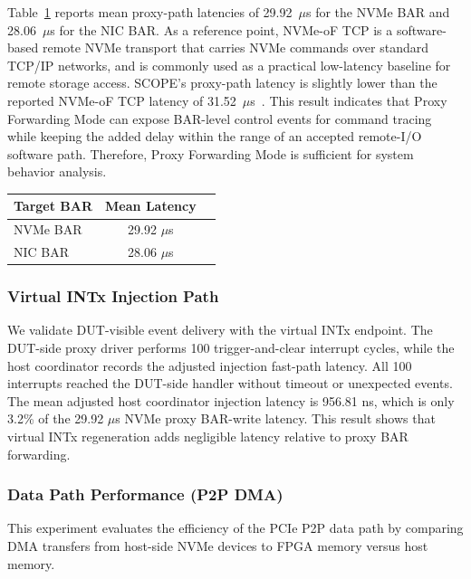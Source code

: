 \documentclass[10pt,conference,letterpaper]{IEEEtran}
\newlength{\scopeTableCaptionWidth}
\newcommand{\scopeTableCaption}[2]{%
    \refstepcounter{table}%
    \settowidth{\scopeTableCaptionWidth}{\footnotesize TABLE~\thetable. #1}%
    \ifdim\scopeTableCaptionWidth>\linewidth
        {\centering\resizebox{\linewidth}{!}{\footnotesize TABLE~\thetable. #1}\par}%
    \else
        {\centering\footnotesize\mbox{TABLE~\thetable. #1}\par}%
    \fi
    \vspace{0.5ex}%
    \label{#2}%
}
\begin{document}
Table~\ref{tab:proxy_bar_write_latency} reports mean proxy-path latencies of 29.92~$\mu$s for the NVMe BAR and 28.06~$\mu$s for the NIC BAR. As a reference point, NVMe-oF TCP is a software-based remote NVMe transport that carries NVMe commands over standard TCP/IP networks, and is commonly used as a practical low-latency baseline for remote storage access. SCOPE's proxy-path latency is slightly lower than the reported NVMe-oF TCP latency of 31.52~$\mu$s~\cite{spdk_tcp_bdev_2205}. This result indicates that Proxy Forwarding Mode can expose BAR-level control events for command tracing while keeping the added delay within the range of an accepted remote-I/O software path. Therefore, Proxy Forwarding Mode is sufficient for system behavior analysis.

\begin{table}[htbp]
    \centering
    \scopeTableCaption{Proxy Forwarding Mode BAR-Write Latency on XiangShan Nanhu-G}{tab:proxy_bar_write_latency}
    \renewcommand{\arraystretch}{1.15}
    \begin{tabular}{@{}lcc@{}}
        \toprule
        \textbf{Target BAR} & \textbf{Mean Latency} \\
        \midrule
        NVMe BAR & 29.92 $\mu$s \\
        NIC BAR & 28.06 $\mu$s \\
        \bottomrule
\end{tabular}
\end{table}



\subsubsection{Virtual INTx Injection Path}
\label{sec:eval_interrupt}

We validate DUT-visible event delivery with the virtual INTx endpoint. The DUT-side proxy driver performs 100 trigger-and-clear interrupt cycles, while the host coordinator records the adjusted injection fast-path latency. All 100 interrupts reached the DUT-side handler without timeout or unexpected events. The mean adjusted host coordinator injection latency is 956.81 ns, which is only 3.2\% of the 29.92 $\mu$s NVMe proxy BAR-write latency. This result shows that virtual INTx regeneration adds negligible latency relative to proxy BAR forwarding.



\subsubsection{Data Path Performance (P2P DMA)}
This experiment evaluates the efficiency of the PCIe P2P data path by comparing DMA transfers from host-side NVMe devices to FPGA memory versus host memory.
\end{document}
